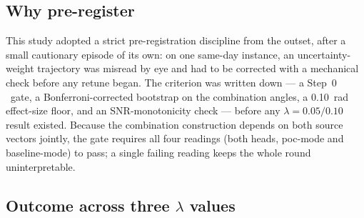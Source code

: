 \subsection{Why pre-register}

This study adopted a strict pre-registration discipline from the outset, after a small cautionary episode of its own: on one same-day instance, an uncertainty-weight trajectory was misread by eye and had to be corrected with a mechanical check before any retune began.
The criterion was written down --- a Step~0 \stdratio\ gate, a Bonferroni-corrected bootstrap on the combination angles, a 0.10~rad effect-size floor, and an SNR-monotonicity check --- before any $\lambda=0.05/0.10$ result existed.
Because the combination construction depends on both source vectors jointly, the gate requires all four readings (both heads, poc-mode and baseline-mode) to pass; a single failing reading keeps the whole round uninterpretable.

\subsection{Outcome across three $\lambda$ values}

\begin{table}[tbp]
    \centering
    \caption{Step~0 gate, all three $\lambda$ rounds, all four readings.}
    \label{tab:gate}
\end{table}

